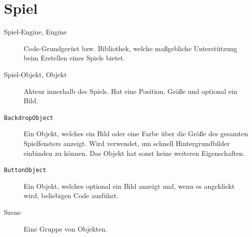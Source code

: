 \section{Spiel}

\begin{description}
	\item[Spiel-Engine, Engine] Code-Grundgerüst bzw. Bibliothek, welche maßgebliche
		Unterstützung beim Erstellen eines Spiels bietet.
	\item[Spiel-Objekt, Objekt] Akteur innerhalb des Spiels. Hat eine Position, Größe und optional ein Bild.
	\item[\texttt{BackdropObject}] Ein Objekt, welches ein Bild oder eine Farbe über die Größe
		des gesamten Spielfensters anzeigt. Wird verwendet, um schnell Hintergrundbilder
		einbinden zu können. Das Objekt hat sonst keine weiteren Eigenschaften.
	\item[\texttt{ButtonObject}] Ein Objekt, welches optional ein Bild anzeigt und, wenn es
	    angeklickt wird, beliebigen Code ausführt.
	\item[Szene] Eine Gruppe von Objekten.
\end{description}